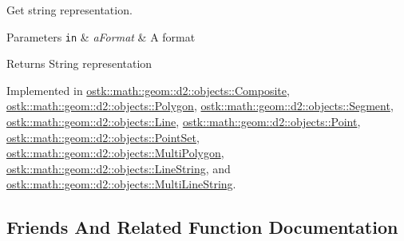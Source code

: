Get string representation. 


\begin{DoxyParams}[1]{Parameters}
\mbox{\tt in}  & {\em a\+Format} & A format \\
\hline
\end{DoxyParams}
\begin{DoxyReturn}{Returns}
String representation 
\end{DoxyReturn}


Implemented in \hyperlink{classostk_1_1math_1_1geom_1_1d2_1_1objects_1_1_composite_abb938e803c4c07b263b36b85324deac3}{ostk\+::math\+::geom\+::d2\+::objects\+::\+Composite}, \hyperlink{classostk_1_1math_1_1geom_1_1d2_1_1objects_1_1_polygon_a6e672ccf5f1101de80e636f097f0a0f7}{ostk\+::math\+::geom\+::d2\+::objects\+::\+Polygon}, \hyperlink{classostk_1_1math_1_1geom_1_1d2_1_1objects_1_1_segment_ac302430065e10f1f281bb8782a904673}{ostk\+::math\+::geom\+::d2\+::objects\+::\+Segment}, \hyperlink{classostk_1_1math_1_1geom_1_1d2_1_1objects_1_1_line_a8b7e13b51e64b9db157ee08a5310646f}{ostk\+::math\+::geom\+::d2\+::objects\+::\+Line}, \hyperlink{classostk_1_1math_1_1geom_1_1d2_1_1objects_1_1_point_ac8fdaee79af60e2972257e43ff175f12}{ostk\+::math\+::geom\+::d2\+::objects\+::\+Point}, \hyperlink{classostk_1_1math_1_1geom_1_1d2_1_1objects_1_1_point_set_af032e86d9d9dcabe229a015a8361daf2}{ostk\+::math\+::geom\+::d2\+::objects\+::\+Point\+Set}, \hyperlink{classostk_1_1math_1_1geom_1_1d2_1_1objects_1_1_multi_polygon_abf52343dc62ec2d62d971bef636f6c1c}{ostk\+::math\+::geom\+::d2\+::objects\+::\+Multi\+Polygon}, \hyperlink{classostk_1_1math_1_1geom_1_1d2_1_1objects_1_1_line_string_a5312030bced48de68f8902bb6581461d}{ostk\+::math\+::geom\+::d2\+::objects\+::\+Line\+String}, and \hyperlink{classostk_1_1math_1_1geom_1_1d2_1_1objects_1_1_multi_line_string_a87df673d41e16eb2b196c8b8a852d71f}{ostk\+::math\+::geom\+::d2\+::objects\+::\+Multi\+Line\+String}.



\subsection{Friends And Related Function Documentation}
\mbox{\label{classostk_1_1math_1_1geom_1_1d2_1_1_object_a418df9bf4a73078f3d494edef1743f8d}} 
